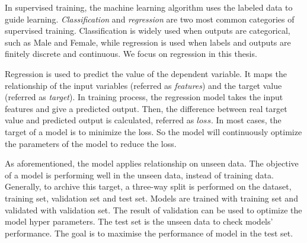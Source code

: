 \documentclass[12pt,a4paper,english
]{tunithesis}
\begin{document}
In supervised training, the machine learning algorithm uses the labeled data to guide learning. \textit{Classification} and \textit{regression} are two most common categories of supervised training. Classification is widely used when outputs are categorical, such as Male and Female, while regression is used when labels and outputs are finitely discrete and continuous. We focus on regression in this thesis. 

\parencite{sagar2024}
Regression is used to predict the value of the dependent variable. It maps the relationship of the input variables (referred as \textit{features}) and the target value (referred as \textit{target}). In training process, the regression model takes the input features and give a predicted output. Then, the difference between real target value and predicted output is calculated, referred as $loss$. In most cases, the target of a model is to minimize the loss. So the model will continuously optimize the parameters of the model to reduce the loss. \parencite{sagar2024, kevin2012}

As aforementioned, the model applies relationship on unseen data. The objective of a model is performing well in the unseen data, instead of training data. Generally, to archive this target, a three-way split is performed on the dataset, training set, validation set and test set. Models are trained with training set and validated with validation set. The result of validation can be used to optimize the model hyper parameters. The test set is the unseen data to check models' performance. The goal is to maximise the performance of model in the test set.
\end{document}
